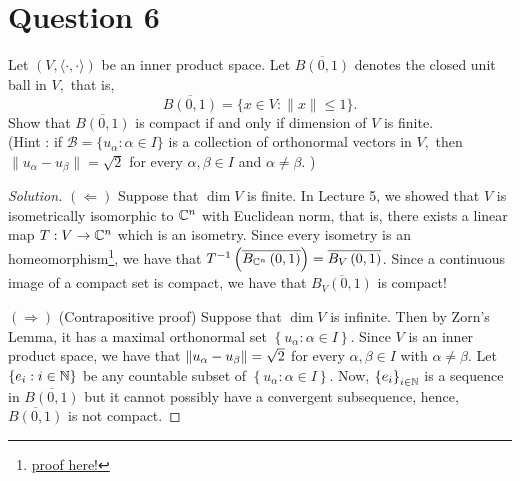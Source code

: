 \section{Question 6}
\horz
Let $(V,\langle \cdot, \cdot \rangle)$ be an inner product space. Let $\overline{B(0,1)}$ denotes the closed unit ball in $V,$ that is, $$\overline{B(0,1)} = \{x\in V : \|x\|\leqslant 1\}.$$ Show that $\overline{B(0,1)}$ is compact if and only if dimension of $V$ is finite. \\
(Hint : if $\mathcal B = \{u_{\alpha} : \alpha\in I\}$ is a collection of orthonormal vectors in $V,$ then $\|u_{\alpha}-u_{\beta}\|=\sqrt{2}$ for  every $\alpha,\beta\in I$ and $\alpha \neq \beta.$ )
\horz

\begin{proof}[Solution]
    $\left( \Longleftarrow \right)$ Suppose that $\dim V$ is finite. In Lecture 5, we showed that $V$ is isometrically isomorphic to $\mathbb C ^{n}$ with Euclidean norm, that is, there exists a linear map $T: V \to \mathbb C^{n}$ which is an isometry. 
    Since every isometry is an homeomorphism\footnote{\href{https://planetmath.org/isometry}{proof here!}}, we have that $T^{-1} \left( \overline{B_{\mathbb C^{n}}\left( 0,1 \right)} \right) = \overline{B_{V} \left( 0,1 \right)}$. Since a continuous image of a compact set is compact, we have that $\overline{B_{V}(0,1)}$ is compact!

    $\left( \Longrightarrow \right)$ (Contrapositive proof) Suppose that $\dim V$ is infinite. Then by Zorn's Lemma, it has a maximal orthonormal set $\left\{ u_{\alpha} : \alpha \in I \right\}$. Since $V$ is an inner product space, we have that $\left\lVert u_{\alpha} - u_{\beta} \right\rVert = \sqrt{2}$ for every $\alpha , \beta \in I$ with $\alpha \ne \beta$. Let $\left\{ e_{i} : i \in \mathbb N \right\}$ be any countable subset of $\left\{ u_{\alpha} : \alpha \in I \right\}$. Now, $\left\{ e_{i} \right\}_{i\in \mathbb N}$ is a sequence in $\overline {B(0,1)}$ but it cannot possibly have a convergent subsequence, hence, $\overline{B(0,1)}$ is not compact.
\end{proof}
